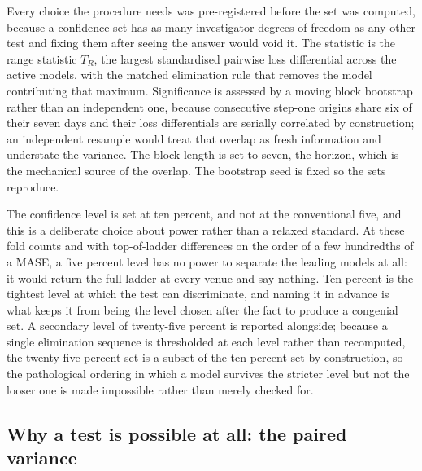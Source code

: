 Every choice the procedure needs was pre-registered before the set was computed, because a
confidence set has as many investigator degrees of freedom as any other test and fixing them
after seeing the answer would void it. The statistic is the range statistic $T_R$, the largest
standardised pairwise loss differential across the active models, with the matched elimination
rule that removes the model contributing that maximum. Significance is assessed by a moving
block bootstrap rather than an independent one, because consecutive step-one origins share six
of their seven days and their loss differentials are serially correlated by construction; an
independent resample would treat that overlap as fresh information and understate the variance.
The block length is set to seven, the horizon, which is the mechanical source of the overlap.
The bootstrap seed is fixed so the sets reproduce.

The confidence level is set at ten percent, and not at the conventional five, and this is a
deliberate choice about power rather than a relaxed standard. At these fold counts and with
top-of-ladder differences on the order of a few hundredths of a MASE, a five percent level has
no power to separate the leading models at all: it would return the full ladder at every venue
and say nothing. Ten percent is the tightest level at which the test can discriminate, and
naming it in advance is what keeps it from being the level chosen after the fact to produce a
congenial set. A secondary level of twenty-five percent is reported alongside; because a single
elimination sequence is thresholded at each level rather than recomputed, the twenty-five
percent set is a subset of the ten percent set by construction, so the pathological ordering in
which a model survives the stricter level but not the looser one is made impossible rather than
merely checked for.

\subsection{Why a test is possible at all: the paired variance}
\label{sec:mcs-paired}

